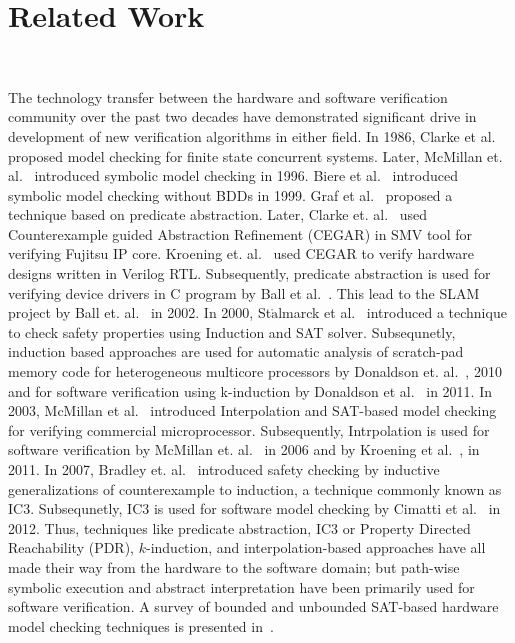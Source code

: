 \section{Related Work}~\label{related_work}
%



The technology transfer between the hardware and software verification community 
over the past two decades have demonstrated significant drive in development of 
new verification algorithms in either field. 
% 
In 1986, Clarke et al.~\cite{clarke86} proposed model checking for finite state 
concurrent systems. Later, McMillan et. al.~\cite{mcmillan96} introduced symbolic 
model checking in 1996.  Biere et al.~\cite{tacas99} introduced symbolic model 
checking without BDDs in 1999.
%
Graf et al.~\cite{cav97} proposed a technique based on predicate abstraction.
Later, Clarke et. al.~\cite{cav2000} used Counterexample guided Abstraction Refinement 
(CEGAR) in SMV tool for verifying Fujitsu IP core.  
Kroening et. al.~\cite{DBLP:conf/tacas/JainKSC07} used CEGAR to 
verify hardware designs written in Verilog RTL.  Subsequently, predicate 
abstraction is used for verifying device drivers in C program by Ball et al.~\cite{pldi01}.  
This lead to the SLAM project by Ball et. al.~\cite{popl02} in 2002.
%
In 2000, St$\mathring{\text{a}}$lmarck et al.~\cite{fmcad2000} introduced a technique 
to check safety properties using Induction and SAT solver.  Subsequnetly, induction 
based approaches are used for automatic analysis of scratch-pad memory code for heterogeneous
multicore processors by Donaldson et. al.~\cite{tacas10}, 2010 and for software 
verification using k-induction by Donaldson et al.~\cite{sas2011} in 2011.
% 
In 2003, McMillan et al.~\cite{cav03} introduced Interpolation and SAT-based model 
checking for verifying commercial microprocessor. Subsequently, Intrpolation is used 
for software verification by McMillan et. al.~\cite{cav06} in 2006 and by 
Kroening et al.~\cite{DBLP:conf/cav/KroeningW11}, in 2011.
%
In 2007, Bradley et. al.~\cite{fmcad07} introduced safety checking by inductive 
generalizations of counterexample to induction, a technique commonly known 
as IC3. Subsequnetly, IC3 is used for software model checking by 
Cimatti et al.~\cite{cav12ic3} in 2012.
%
Thus, techniques like predicate abstraction, 
IC3 or Property Directed Reachability (PDR), $k$-induction, and 
interpolation-based approaches have all made their way from the hardware 
to the software domain; but path-wise symbolic execution and abstract 
interpretation have been primarily used for software verification.
%
A survey of bounded and unbounded SAT-based hardware model checking techniques 
is presented in~\cite{DBLP:conf/charme/AmlaDKKM05}.
%

